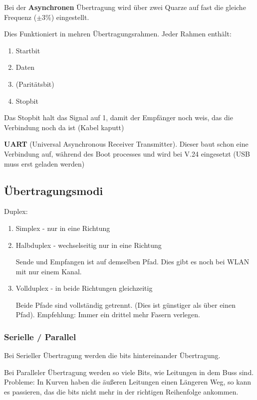 \documentclass[a4paper]{article}
\begin{document}
Bei der \textbf{Asynchronen} Übertragung wird über zwei Quarze auf fast die gleiche Frequenz ($\pm3$\%) eingestellt.

Dies Funktioniert in mehren Übertragungsrahmen. Jeder Rahmen enthält:

\begin{enumerate}
    \item Startbit
    \item Daten
    \item (Paritätsbit)
    \item Stopbit
\end{enumerate}

Das Stopbit halt das Signal auf 1, damit der Empfänger noch weis, das die Verbindung noch da ist (Kabel kaputt)

\textbf{UART} (Universal Asynchronous Receiver Transmitter). Dieser baut schon eine Verbindung auf, während des Boot processes und wird bei V.24 eingesetzt (USB muss erst geladen werden)

\subsection{Übertragungsmodi}

Duplex:

\begin{enumerate}
    \item Simplex - nur in eine Richtung
    \item Halbduplex - wechselseitig nur in eine Richtung
    
    Sende und Empfangen ist auf demselben Pfad. Dies gibt es noch bei WLAN mit nur einem Kanal.
    \item Vollduplex - in beide Richtungen gleichzeitig
    
    Beide Pfade sind vollständig getrennt. (Dies ist günstiger als über einen Pfad). Empfehlung: Immer ein drittel mehr Fasern verlegen.
\end{enumerate}

\subsubsection*{Serielle / Parallel}

Bei Serieller Übertragung werden die bits hintereinander Übertragung.

Bei Paralleler Übertragung werden so viele Bits, wie Leitungen in dem Buss sind. Probleme: In Kurven haben die äußeren Leitungen einen Längeren Weg, so kann es passieren, das die bits nicht mehr in der richtigen Reihenfolge ankommen.
\end{document}

